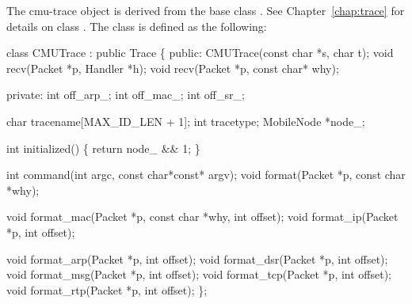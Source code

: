 The cmu-trace object  is derived from the base class
. See Chapter~\ref{chap:trace} for details on class
. The class  is defined as the following:

\begin{program}
class CMUTrace : public Trace \{
public:
        CMUTrace(const char *s, char t);
        void    recv(Packet *p, Handler *h);
        void    recv(Packet *p, const char* why);

private:
        int off_arp_;
        int off_mac_;
        int off_sr_;

        char    tracename[MAX_ID_LEN + 1];
        int     tracetype;
        MobileNode *node_;

        int initialized() \{ return node_ && 1; \}

        int     command(int argc, const char*const* argv);
        void    format(Packet *p, const char *why);

        void    format_mac(Packet *p, const char *why, int offset);
        void    format_ip(Packet *p, int offset);

        void    format_arp(Packet *p, int offset);
        void    format_dsr(Packet *p, int offset);
        void    format_msg(Packet *p, int offset);
        void    format_tcp(Packet *p, int offset);
        void    format_rtp(Packet *p, int offset);
\};
\end{program}

